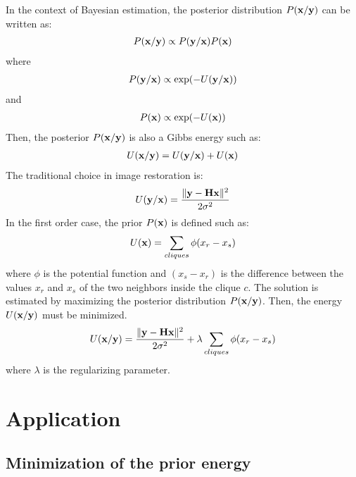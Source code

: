 In the context of Bayesian estimation, the posterior distribution  
$P({\bf x/y})$ can be written as:
\begin{eqnarray}
P({\bf x/y}) \propto P({\bf y/x})P({\bf x}) 
\end{eqnarray}
where 
\begin{eqnarray} 
P({\bf y/x}) \propto \exp(-U({\bf y/x})) 
\end{eqnarray}
and
\begin{eqnarray}
P({\bf x}) \propto \exp(-U({\bf x}))
\end{eqnarray}
Then, the posterior $P({\bf x/y})$ is also a Gibbs energy such as:
\begin{eqnarray}
U({\bf x/y}) = U({\bf y/x}) + U({\bf x})
\end{eqnarray}
The traditional choice in image restoration is:
\begin{eqnarray} 
U({\bf y/x}) = \frac{\|{\bf y-Hx}\|^2}{2\sigma^2}
\end{eqnarray}
In the first order case, the prior $P({\bf x})$ is defined such as:
\begin{eqnarray} 
U({\bf x}) = \sum_{cliques} \phi(x_r-x_s)
\end{eqnarray} 
where $\phi$ is the potential function and $(x_s-x_r)$ is the difference 
between the values $x_r$ and $x_s$ of the two neighbors inside the 
clique $c$.
The solution is estimated by maximizing the posterior distribution
$P({\bf x/y})$.
Then, the energy $U({\bf x/y})$ must be minimized.
\begin{eqnarray} 
U({\bf x/y}) = \frac{\|{\bf y-Hx}\|^2}{2\sigma^2}
               + \lambda \sum_{cliques} \phi(x_r-x_s) 
\label{mar_eqn_cr}	       
\end{eqnarray}
where $\lambda$ is the regularizing parameter.

\section{Application}

\subsection{Minimization of the prior energy}

